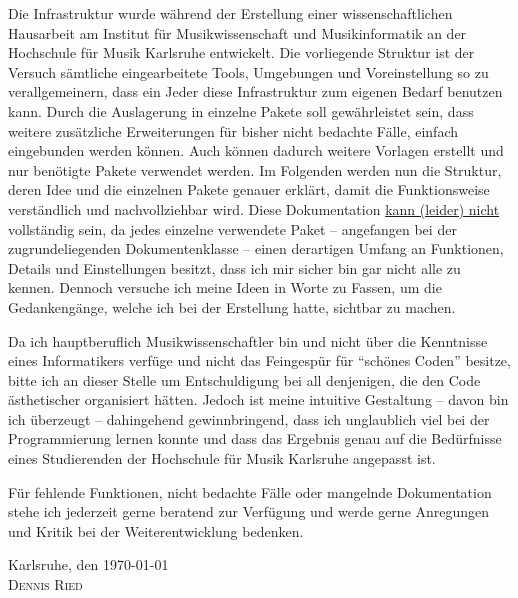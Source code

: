 

Die Infrastruktur wurde während der Erstellung einer wissenschaftlichen Hausarbeit am Institut für Musikwissenschaft und Musikinformatik an der Hochschule für Musik Karlsruhe entwickelt.
Die vorliegende Struktur ist der Versuch sämtliche eingearbeitete Tools, Umgebungen und Voreinstellung so zu verallgemeinern, dass ein Jeder diese Infrastruktur zum eigenen Bedarf benutzen kann.
Durch die Auslagerung in einzelne Pakete soll gewährleistet sein, dass weitere zusätzliche Erweiterungen für bisher nicht bedachte Fälle, einfach eingebunden werden können.
Auch können dadurch weitere Vorlagen erstellt und nur benötigte Pakete verwendet werden.
Im Folgenden werden nun die Struktur, deren Idee und die einzelnen Pakete genauer erklärt, damit die Funktionsweise verständlich und nachvollziehbar wird.
Diese Dokumentation \underline{kann (leider) nicht} vollständig sein, da jedes einzelne verwendete Paket -- angefangen bei der zugrundeliegenden Dokumentenklasse -- einen derartigen Umfang an Funktionen, Details und Einstellungen besitzt, dass ich mir sicher bin gar nicht alle zu kennen.
Dennoch versuche ich meine Ideen in Worte zu Fassen, um die Gedankengänge, welche ich bei der Erstellung hatte, sichtbar zu machen.

Da ich hauptberuflich Musikwissenschaftler bin und nicht über die Kenntnisse eines Informatikers verfüge und nicht das Feingespür für \enquote{schönes Coden} besitze, bitte ich an dieser Stelle um Entschuldigung bei all denjenigen, die den Code ästhetischer organisiert hätten.
Jedoch ist meine intuitive Gestaltung -- davon bin ich überzeugt -- dahingehend gewinnbringend, dass ich unglaublich viel bei der Programmierung lernen konnte und dass das Ergebnis genau auf die Bedürfnisse eines Studierenden der Hochschule für Musik Karlsruhe angepasst ist.

Für fehlende Funktionen, nicht bedachte Fälle oder mangelnde Dokumentation stehe ich jederzeit gerne beratend zur Verfügung und werde gerne Anregungen und Kritik bei der Weiterentwicklung bedenken.

\begin{flushright}
	Karlsruhe, den \today\\
	\textsc{Dennis Ried}
\end{flushright}